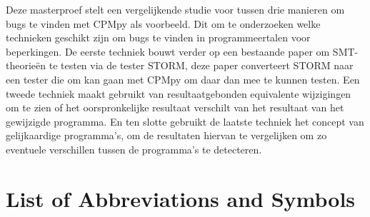 \documentclass[master=cws,masteroption=se,english]{kulemt} %
\begin{document}
\begin{abstract*}
%
Deze masterproef stelt een vergelijkende studie voor tussen drie manieren om bugs te vinden met CPMpy als voorbeeld. Dit om te onderzoeken welke technieken geschikt zijn om bugs te vinden in programmeertalen voor beperkingen.
De eerste techniek bouwt verder op een bestaande paper om SMT-theorieën te testen via de tester STORM, deze paper converteert STORM naar een tester die om kan gaan met CPMpy om daar dan mee te kunnen testen.
Een tweede techniek maakt gebruikt van resultaatgebonden equivalente wijzigingen om te zien of het oorspronkelijke resultaat verschilt van het resultaat van het gewijzigde programma. En ten slotte gebruikt de laatste techniek het concept van gelijkaardige programma's, om de resultaten hiervan te vergelijken om zo eventuele verschillen tussen de programma's te detecteren.


\end{abstract*}

\listoffiguresandtables
\lstlistoflistings
\chapter{List of Abbreviations and Symbols}
\end{document}
